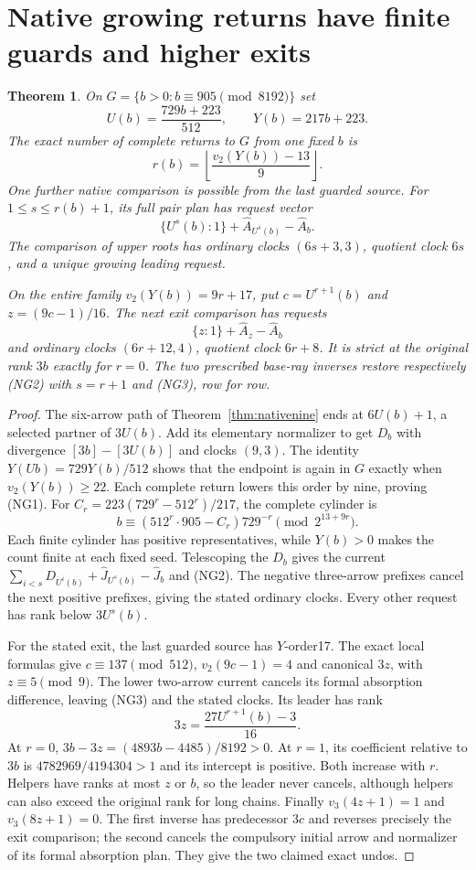 \documentclass[11pt]{article}
\newtheorem{theorem}{Theorem}
\begin{document}
\section{Native growing returns have finite guards and higher exits}
\begin{theorem}\label{thm:nativegrowth}
On $G=\{b>0:b\equiv905\pmod{8192}\}$ set
\[
 U(b)=\frac{729b+223}{512},\qquad Y(b)=217b+223.
\]
The exact number of complete returns to $G$ from one fixed $b$ is
\[
 r(b)=\left\lfloor\frac{v_2(Y(b))-13}{9}\right\rfloor.
 \tag{NG1}
\]
One further native comparison is possible from the last guarded source.
For $1\le s\le r(b)+1$, its full pair plan has request vector
\[
 \{U^s(b):1\}+\widehat A_{U^s(b)}-\widehat A_b.
 \tag{NG2}
\]
The comparison of upper roots has ordinary clocks $(6s+3,3)$,
quotient clock $6s$, and a unique growing leading request.

On the entire family $v_2(Y(b))=9r+17$, put
$c=U^{r+1}(b)$ and $z=(9c-1)/16$.
The next exit comparison has requests
\[
 \{z:1\}+\widehat A_z-\widehat A_b
 \tag{NG3}
\]
and ordinary clocks $(6r+12,4)$, quotient clock $6r+8$.
It is strict at the original rank $3b$ exactly for $r=0$.
The two prescribed base-ray inverses restore respectively (NG2)
with $s=r+1$ and (NG3), row for row.
\end{theorem}
\begin{proof}
The six-arrow path of Theorem~\ref{thm:nativenine} ends at
$6U(b)+1$, a selected partner of $3U(b)$. Add its elementary
normalizer to get $D_b$ with divergence $[3b]-[3U(b)]$ and
clocks $(9,3)$. The identity $Y(Ub)=729Y(b)/512$ shows that
the endpoint is again in $G$ exactly when $v_2(Y(b))\ge22$.
Each complete return lowers this order by nine, proving (NG1).
For $C_r=223(729^r-512^r)/217$, the complete cylinder is
\[
 b\equiv(512^r\cdot905-C_r)729^{-r}\pmod{2^{13+9r}}.
\]
Each finite cylinder has positive representatives, while $Y(b)>0$
makes the count finite at each fixed seed. Telescoping the $D_b$
gives the current $\sum_{i<s}D_{U^i(b)}+
\widehat J_{U^s(b)}-\widehat J_b$ and (NG2).
The negative three-arrow prefixes cancel the next positive prefixes,
giving the stated ordinary clocks. Every other request has rank
below $3U^s(b)$.

For the stated exit, the last guarded source has $Y$-order17.
The exact local formulas give $c\equiv137\pmod{512}$,
$v_2(9c-1)=4$ and canonical $3z$, with $z\equiv5\pmod9$.
The lower two-arrow current cancels its formal absorption difference,
leaving (NG3) and the stated clocks. Its leader has rank
\[
 3z=\frac{27U^{r+1}(b)-3}{16}.
\]
At $r=0$, $3b-3z=(4893b-4485)/8192>0$.
At $r=1$, its coefficient relative to $3b$ is
$4782969/4194304>1$ and its intercept is positive.
Both increase with $r$. Helpers have ranks at most $z$ or $b$,
so the leader never cancels, although helpers can also exceed
the original rank for long chains.
Finally $v_3(4z+1)=1$ and $v_3(8z+1)=0$.
The first inverse has predecessor $3c$ and reverses precisely
the exit comparison; the second cancels the compulsory initial
arrow and normalizer of its formal absorption plan. They give
the two claimed exact undos.
\end{proof}
\end{document}

